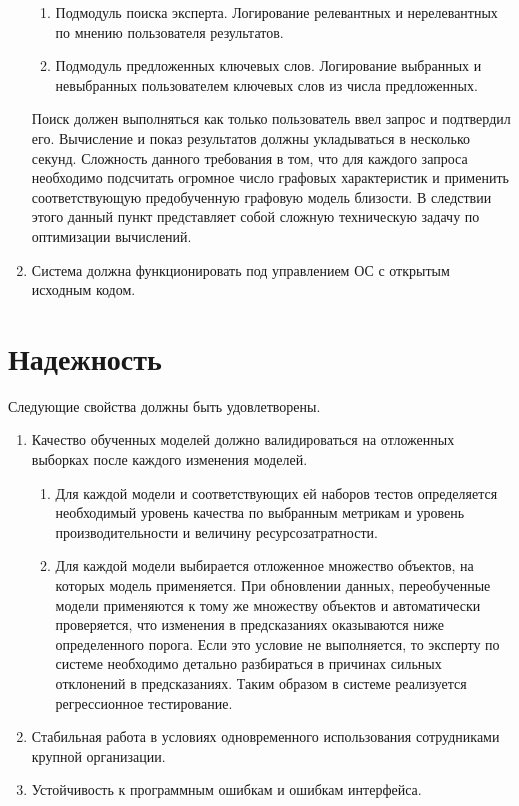 \begin{enumerate}
    \begin{enumerate}
        \item Подмодуль поиска эксперта. Логирование релевантных и нерелевантных по мнению пользователя результатов.
        \item Подмодуль предложенных ключевых слов. Логирование выбранных и невыбранных пользователем ключевых слов из числа предложенных.
    \end{enumerate}
    Поиск должен выполняться как только пользователь ввел запрос и подтвердил его. Вычисление и показ результатов должны укладываться в несколько секунд. Сложность данного требования в том, что для каждого запроса необходимо подсчитать огромное число графовых характеристик и применить соответствующую предобученную графовую модель близости. В следствии этого данный пункт представляет собой сложную техническую задачу по оптимизации вычислений.
    \item Система должна функционировать под управлением ОС с открытым исходным кодом.
\end{enumerate}

\section{Надежность}
Следующие свойства должны быть удовлетворены.
\begin{enumerate}
    \item  Качество обученных моделей должно валидироваться на отложенных выборках после каждого изменения моделей.
        \begin{enumerate}
            \item Для каждой модели и соответствующих ей наборов тестов определяется необходимый уровень качества по выбранным метрикам и уровень производительности и величину ресурсозатратности.
            \item Для каждой модели выбирается отложенное множество объектов, на которых модель применяется. При обновлении данных, переобученные модели применяются к тому же множеству объектов и автоматически проверяется, что изменения в предсказаниях оказываются ниже определенного порога. Если это условие не выполняется, то эксперту по системе необходимо детально разбираться в причинах сильных отклонений в предсказаниях. Таким образом в системе реализуется регрессионное тестирование.
        \end{enumerate}
    \item  Стабильная работа в условиях одновременного использования сотрудниками крупной организации.
    \item  Устойчивость к программным ошибкам и ошибкам интерфейса.
\end{enumerate}
